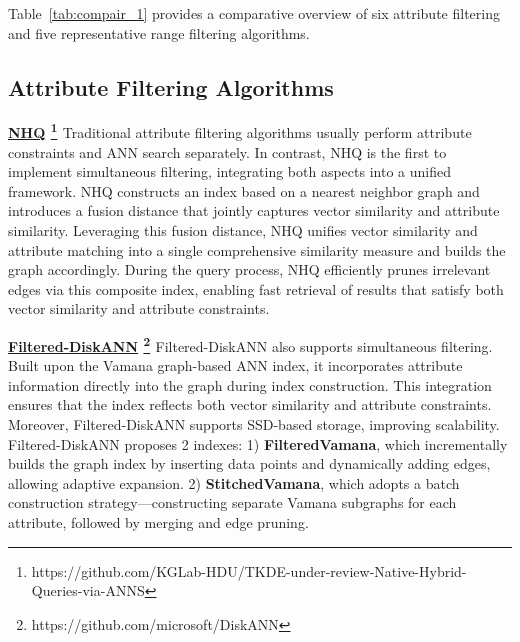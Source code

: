 \documentclass[sigconf, nonacm]{acmart}
\begin{document}
	
	Table~\ref{tab:compair_1} provides a comparative overview of six attribute filtering and five representative range filtering algorithms. 
	
	\subsection{Attribute Filtering Algorithms}
	

	\noindent\textbf{\underline{NHQ} \footnote{https://github.com/KGLab-HDU/TKDE-under-review-Native-Hybrid-Queries-via-ANNS} \cite{NHQ}}
	Traditional attribute filtering algorithms usually perform attribute constraints and ANN search separately. In contrast, NHQ is the first to implement simultaneous filtering, integrating both aspects into a unified framework. NHQ constructs an index based on a nearest neighbor graph and introduces a fusion distance that jointly captures vector similarity and attribute similarity. Leveraging this fusion distance, NHQ unifies vector similarity and attribute matching into a single comprehensive similarity measure and builds the graph accordingly. During the query process, NHQ efficiently prunes irrelevant edges via this composite index, enabling fast retrieval of results that satisfy both vector similarity and attribute constraints.
	
	\noindent\textbf{\underline{Filtered-DiskANN} \footnote{https://github.com/microsoft/DiskANN} \cite{Filtered-diskann}}
	Filtered-DiskANN also supports simultaneous filtering. Built upon the Vamana \cite{diskann} graph-based ANN index, it incorporates attribute information directly into the graph during index construction. This integration ensures that the index reflects both vector similarity and attribute constraints. Moreover, Filtered-DiskANN supports SSD-based storage, improving scalability.
	Filtered-DiskANN proposes 2 indexes:  
	1) \textbf{FilteredVamana}, which incrementally builds the graph index by inserting data points and dynamically adding edges, allowing adaptive expansion.  
	2) \textbf{StitchedVamana}, which adopts a batch construction strategy—constructing separate Vamana subgraphs for each attribute, followed by merging and edge pruning.
	
\end{document}
